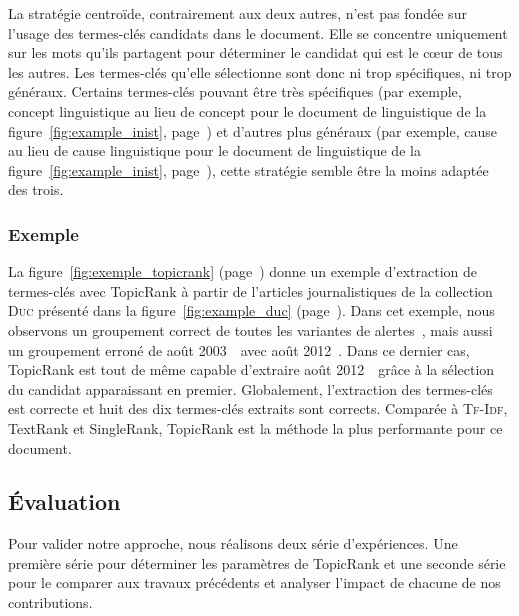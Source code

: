         La stratégie centroïde, contrairement aux deux autres, n'est pas fondée
        sur l'usage des termes-clés candidats dans le document. Elle se
        concentre uniquement sur les mots qu'ils partagent pour déterminer le
        candidat qui est le c\oe{}ur de tous les autres. Les termes-clés qu'elle
        sélectionne sont donc ni trop spécifiques, ni trop généraux. Certains
        termes-clés pouvant être très spécifiques (par exemple, \og{}concept
        linguistique\fg{} au lieu de \og{}concept\fg{} pour le document de
        linguistique de la figure~\ref{fig:example_inist},
        page~\pageref{fig:example_inist}) et d'autres plus généraux (par
        exemple, \og{}cause\fg{} au lieu de \og{}cause linguistique\fg{} pour le
        document de linguistique de la figure~\ref{fig:example_inist},
        page~\pageref{fig:example_inist}), cette stratégie semble être la moins
        adaptée des trois.

      \subsubsection{Exemple}
      \label{subsubsec:main:domain_independent_keyphrase_extraction-unsupervised_automatic_keyphrase_extraction-topicrank-example}
        La figure~\ref{fig:exemple_topicrank}
        (page~\pageref{fig:exemple_topicrank}) donne un exemple d'extraction de
        termes-clés avec TopicRank à partir de l'articles journalistiques
        de la collection \textsc{Duc} présenté dans la figure~\ref{fig:example_duc}
        (page~\pageref{fig:example_duc}). Dans cet exemple,
        nous observons un groupement correct de toutes les variantes de \og
        alertes~\fg, mais aussi un groupement erroné de \og août 2003~\fg\ avec
        \og août 2012~\fg. Dans ce dernier cas, TopicRank est tout de même
        capable d'extraire \og août 2012~\fg\ grâce à la sélection du candidat
        apparaissant en premier. Globalement, l'extraction des termes-clés est
        correcte et huit des dix termes-clés extraits sont corrects. Comparée à
        \textsc{Tf-Idf}, TextRank et SingleRank, TopicRank est la méthode la
        plus performante pour ce document.
        

    \subsection{Évaluation}
    \label{subsec:main:domain_independent_keyphrase_extraction-unsupervised_automatic_keyphrase_extraction-evaluation}
      Pour valider notre approche, nous réalisons deux série d'expériences. Une
      première série pour déterminer les paramètres de TopicRank et
      une seconde série pour le comparer aux travaux précédents et analyser
      l'impact de chacune de nos contributions.
      
